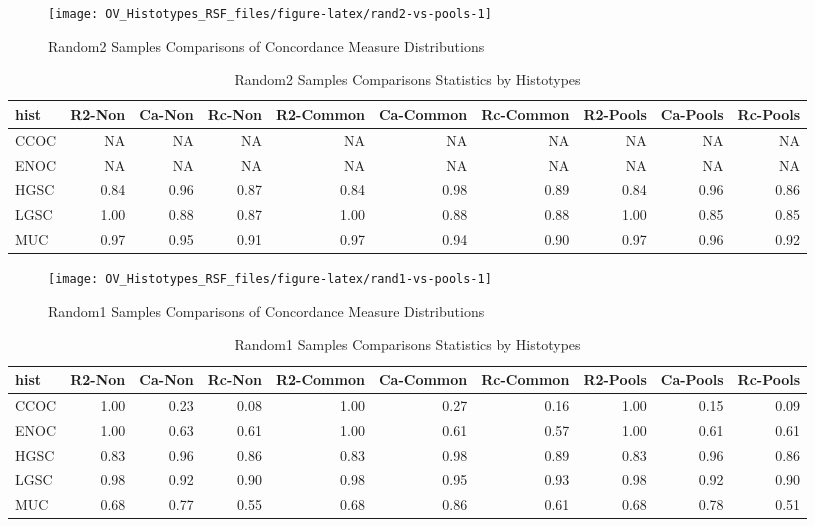 \documentclass[
]{report}
\begin{document}
\begin{figure}[H]

{\centering \texttt{[image: OV\_Histotypes\_RSF\_files/figure-latex/rand2-vs-pools-1]} 

}

\caption{Random2 Samples Comparisons of Concordance Measure Distributions}\label{fig:rand2-vs-pools}
\end{figure}

\begin{table}

\caption{\label{tab:rand2-vs-pools-stats}Random2 Samples Comparisons Statistics by Histotypes}
\centering
\begin{tabular}[t]{l|r|r|r|r|r|r|r|r|r}
\hline
hist & R2-Non & Ca-Non & Rc-Non & R2-Common & Ca-Common & Rc-Common & R2-Pools & Ca-Pools & Rc-Pools\\
\hline
CCOC & NA & NA & NA & NA & NA & NA & NA & NA & NA\\
\hline
ENOC & NA & NA & NA & NA & NA & NA & NA & NA & NA\\
\hline
HGSC & 0.84 & 0.96 & 0.87 & 0.84 & 0.98 & 0.89 & 0.84 & 0.96 & 0.86\\
\hline
LGSC & 1.00 & 0.88 & 0.87 & 1.00 & 0.88 & 0.88 & 1.00 & 0.85 & 0.85\\
\hline
MUC & 0.97 & 0.95 & 0.91 & 0.97 & 0.94 & 0.90 & 0.97 & 0.96 & 0.92\\
\hline
\end{tabular}
\end{table}

\begin{figure}[H]

{\centering \texttt{[image: OV\_Histotypes\_RSF\_files/figure-latex/rand1-vs-pools-1]} 

}

\caption{Random1 Samples Comparisons of Concordance Measure Distributions}\label{fig:rand1-vs-pools}
\end{figure}

\begin{table}

\caption{\label{tab:rand1-vs-pools-stats}Random1 Samples Comparisons Statistics by Histotypes}
\centering
\begin{tabular}[t]{l|r|r|r|r|r|r|r|r|r}
\hline
hist & R2-Non & Ca-Non & Rc-Non & R2-Common & Ca-Common & Rc-Common & R2-Pools & Ca-Pools & Rc-Pools\\
\hline
CCOC & 1.00 & 0.23 & 0.08 & 1.00 & 0.27 & 0.16 & 1.00 & 0.15 & 0.09\\
\hline
ENOC & 1.00 & 0.63 & 0.61 & 1.00 & 0.61 & 0.57 & 1.00 & 0.61 & 0.61\\
\hline
HGSC & 0.83 & 0.96 & 0.86 & 0.83 & 0.98 & 0.89 & 0.83 & 0.96 & 0.86\\
\hline
LGSC & 0.98 & 0.92 & 0.90 & 0.98 & 0.95 & 0.93 & 0.98 & 0.92 & 0.90\\
\hline
MUC & 0.68 & 0.77 & 0.55 & 0.68 & 0.86 & 0.61 & 0.68 & 0.78 & 0.51\\
\hline
\end{tabular}
\end{table}
\end{document}
